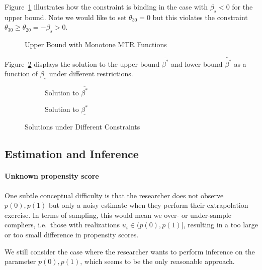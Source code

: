 \documentclass[11pt,a4paper,english]{article} %
\numberwithin{equation}{section}
\numberwithin{figure}{section}
\numberwithin{table}{section}
\theoremstyle{definition}
\theoremstyle{remark}
\begin{document}
Figure~\ref{fig:sm_upper_incr.tex} illustrates how the constraint is binding in the case with $\beta_s < 0$ for the upper bound.
Note we would like to set $\theta_{30} = 0$ but this violates the constraint $\theta_{30} \geq \theta_{20} = -\beta_s > 0$.

\begin{figure}
	
	\caption{Upper Bound with Monotone MTR Functions}\label{fig:sm_upper_incr.tex}
\end{figure}

Figure~\ref{fig:sm_sol_upper} displays the solution to the upper bound $\overline{\beta^*}$ and lower bound $\underleftarrow{\beta^*}$ as a function of $\beta_s$ under different restrictions.
\begin{figure}
	\centering
	\begin{subfigure}{0.45\textwidth}
		\centering
		
		\caption{Solution to $\overline{\beta^*}$}
	\end{subfigure}
	\hfill
	\begin{subfigure}{0.45\textwidth}
		\centering
		
		\caption{Solution to $\underline{\beta^*}$}
	\end{subfigure}
	\caption{Solutions under Different Constraints}\label{fig:sm_sol_upper}
\end{figure}

\subsection{Estimation and Inference}
\paragraph{Unknown propensity score}
One subtle conceptual difficulty is that the researcher does not observe $p(0), p(1)$ but only a noisy estimate when they perform their extrapolation exercise. In terms of sampling, this would mean we over- or under-sample compliers, i.e.\ those with realizations $u_i\in (p(0), p(1)]$, resulting in a too large or too small difference in propensity scores.

We still consider the case where the researcher wants to perform inference on the parameter $p(0), p(1)$, which seems to be the only reasonable approach.
\end{document}
